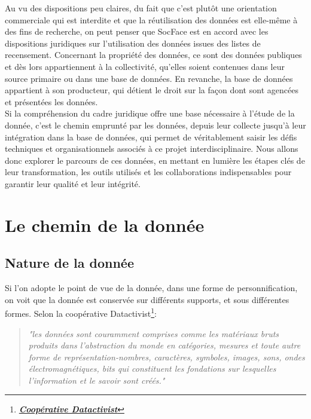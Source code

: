 Au vu des dispositions peu claires, du fait que c’est plutôt une orientation commerciale qui est interdite et que la réutilisation des données est elle-même à des fins de recherche, on peut penser que SocFace est en accord avec les dispositions juridiques sur l’utilisation des données issues des listes de recensement. Concernant la propriété des données, ce sont des données publiques et dès lors appartiennent à la collectivité, qu’elles soient contenues dans leur source primaire ou dans une base de données. En revanche, la base de données appartient à son producteur, qui détient le droit sur la façon dont sont agencées et présentées les données.\\

Si la compréhension du cadre juridique offre une base nécessaire à l’étude de la donnée, c’est le chemin emprunté par les données, depuis leur collecte jusqu’à leur intégration dans la base de données, qui permet de véritablement saisir les défis techniques et organisationnels associés à ce projet interdisciplinaire. Nous allons donc explorer le parcours de ces données, en mettant en lumière les étapes clés de leur transformation, les outils utilisés et les collaborations indispensables pour garantir leur qualité et leur intégrité.

    \section{Le chemin de la donnée}

        \subsection{Nature de la donnée}

Si l’on adopte le point de vue de la donnée, dans une forme de personnification, on voit que la donnée est conservée sur différents supports, et sous différentes formes. Selon la coopérative Datactivist\footnote{\href{https://datactivist.coop/fr/}{\textbf{\textit{Coopérative Datactivist}}}}: 
\begin{quote}  
\textit{"les données sont couramment comprises comme les matériaux bruts produits dans l’abstraction du monde en catégories, mesures et toute autre forme de représentation-nombres, caractères, symboles, images, sons, ondes électromagnétiques, bits qui constituent les fondations sur lesquelles l’information et le savoir sont créés."}
\end{quote}

